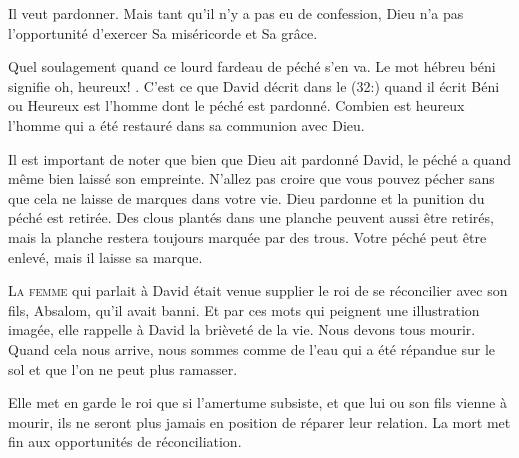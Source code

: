 
Il veut pardonner.
 Mais tant qu'il n'y a pas eu de confession,
 Dieu n'a pas l'opportunité d'exercer Sa miséricorde et Sa grâce. 

Quel soulagement quand ce lourd fardeau de péché s'en va.
 Le mot hébreu \Og béni \Fg{} signifie \Og oh, heureux! \Fg{}.
 C'est ce que David décrit dans le (32:)
 quand il écrit \Og Béni \Fg{} ou \Og Heureux \Fg{} est l'homme
 dont le péché est pardonné.
 Combien est heureux l'homme qui a été restauré
 dans sa communion avec Dieu. 

Il est important de noter que bien que Dieu ait pardonné David,
 le péché a quand même bien laissé son empreinte.
 N'allez pas croire que vous pouvez pécher sans que cela ne laisse
 de marques dans votre vie.
 Dieu pardonne et la punition du péché est retirée.
 Des clous plantés dans une planche peuvent aussi être retirés,
 mais la planche restera toujours marquée par des trous.
 Votre péché peut être enlevé, mais il laisse sa marque. 

\dvrule







\lettrine{L}{a femme} qui parlait à David était venue supplier
 le roi de se réconcilier avec son fils, Absalom, qu'il avait banni.
 Et par ces mots qui peignent une illustration imagée, elle rappelle à David
 la brièveté de la vie. Nous devons tous mourir.
 Quand cela nous arrive, nous sommes comme de l'eau qui a été répandue
 sur le sol et que l'on ne peut plus ramasser. 

Elle met en garde le roi que si l'amertume subsiste, et que lui ou son fils
 vienne à mourir, ils ne seront plus jamais en position
 de réparer leur relation.
 La mort met fin aux opportunités de réconciliation. 

